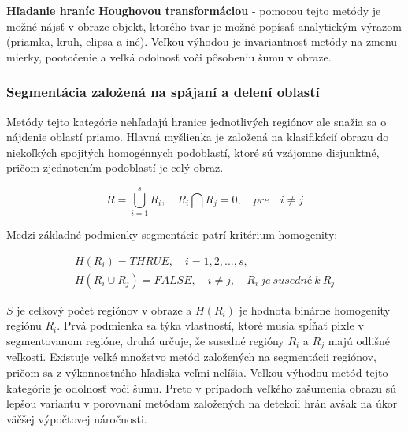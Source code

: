 \textbf{Hľadanie hraníc Houghovou transformáciou} \cite{houghova_transformacia} - pomocou tejto metódy je možné nájsť v obraze objekt, ktorého tvar je možné popísať analytickým výrazom (priamka, kruh, elipsa a iné). Veľkou výhodou je invariantnosť metódy na zmenu mierky, pootočenie a veľká odolnosť voči pôsobeniu šumu v obraze. \cite{houghova_transformacia} 

\subsubsection{Segmentácia založená na spájaní a delení oblastí}
Metódy tejto kategórie nehľadajú hranice jednotlivých regiónov ale snažia sa o nájdenie oblastí priamo. Hlavná myšlienka je založená na klasifikácií obrazu do niekoľkých spojitých homogénnych podoblastí, ktoré sú vzájomne disjunktné, pričom zjednotením podoblastí je celý obraz. \cite{pocitacove_videnie_v_praxi}

\begin{equation}
    R=\bigcup_{i=1}^s R_i{,}\quad R_i\bigcap R_j=0{,}\quad{pre}\quad i\neq j
\end{equation}

Medzi základné podmienky segmentácie patrí kritérium homogenity:

\begin{equation}
    \begin{gathered}
        H(R_i)={THRUE}{,}\quad \textit{i}=1{,}2{,}{...}{,}s{,}\\ 
        H(R_i \cup R_j)={FALSE}{,}\quad \textit{i} \neq \textit{j}{,}\quad R_i { \ je \ susedné \ k \ } R_j
    \end{gathered}
\end{equation}

$S$ je celkový počet regiónov v obraze a $H(R_i)$ je hodnota binárne homogenity regiónu $R_i$. Prvá podmienka sa týka vlastností, ktoré musia spĺňať pixle v segmentovanom regióne, druhá určuje, že susedné regióny $R_i$ a $R_j$ majú odlišné veľkosti. Existuje veľké množstvo metód založených na segmentácii regiónov, pričom sa z výkonnostného hľadiska veľmi nelíšia. Veľkou výhodou metód tejto kategórie je odolnosť voči šumu. Preto v prípadoch veľkého zašumenia obrazu sú lepšou variantu v porovnaní metódam založených na detekcii hrán avšak na úkor väčšej výpočtovej náročnosti. \cite{pocitacove_videnie_v_praxi}


